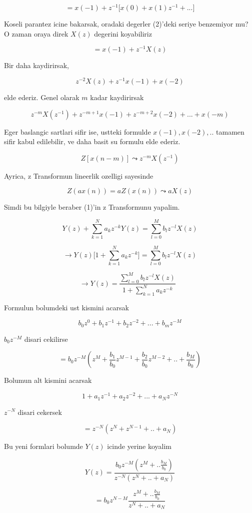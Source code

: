\documentclass[12pt,fleqn]{article}
\begin{document}
\[ = x(-1) + z^{-1} \bigg[ x(0) + x(1) z^{-1} + ... \bigg] \]

Koseli parantez icine bakarsak, oradaki degerler (2)'deki seriye benzemiyor
mu? O zaman oraya direk $X(z)$ degerini koyabiliriz

\[ = x(-1) + z^{-1}X(z)\]

Bir daha kaydirirsak, 

\[ z^{-2}X(z) + z^{-1}x(-1) + x(-2) \]

elde ederiz. Genel olarak $m$ kadar kaydirirsak

\[ z^{-m}X(z^{-1}) + z^{-m+1}x(-1) + z^{-m+2}x(-2) + ... + x(-m) \]

Eger baslangic sartlari sifir ise, ustteki formulde $x(-1),x(-2),..$
tamamen sifir kabul edilebilir, ve daha basit su formulu elde ederiz. 

\[ Z[x(n-m)] \leadsto z^{-m}X(z^{-1})\]

Ayrica, z Transformun lineerlik ozelligi sayesinde 

\[ Z(ax(n)) = aZ(x(n)) \leadsto aX(z) \]

Simdi bu bilgiyle beraber (1)'in z Transformunu yapalim. 

\[ Y(z) + \sum_{k=1}^Na_kz^{-k}Y(z) = \sum_{l=0}^M b_l z^{-l}X(z)  \]

\[ \to Y(z) \bigg[ 1 + \sum_{k=1}^Na_kz^{-k} \bigg] = \sum_{l=0}^M b_l z^{-l}X(z)  \]

\[ \to Y(z)  = \frac{\sum_{l=0}^M b_l z^{-l}X(z) }{ 1 +
  \sum_{k=1}^Na_kz^{-k}} 
\ \ \ \label{5}
\]

Formulun bolumdeki ust kismini acarsak 

\[ b_0z^0 + b_1z^{-1} + b_2z^{-2} + ... + b_mz^{-M} \]

$b_0z^{-M}$ disari cekilirse

\[ = b_0z^{-M}(z^M + \frac{b_1}{b_0}z^{M-1} +  \frac{b_2}{b_0}z^{M-2} +
.. + 
 \frac{b_M}{b_0})
\]

Bolumun alt kismini acarsak 

\[ 1 + a_1z^{-1} + a_2z^{-2} + ... + a_Nz^{-N} \]

$z^{-N}$ disari cekersek 

\[ = z^{-N} ( z^{N} + z^{N-1} + .. + a_N) \]

Bu yeni formlari bolumde $Y(z)$ icinde yerine koyalim

\[ Y(z) = 
\frac{b_0z^{-M}(z^M + ..\frac{b_M}{b_0})}{z^{-N} ( z^{N} + .. + a_N)} 
\]

\[ = b_0 z^{N - M} \frac{z^M + ..\frac{b_M}{b_0}}{z^{N} + .. + a_N }\]
\end{document}
